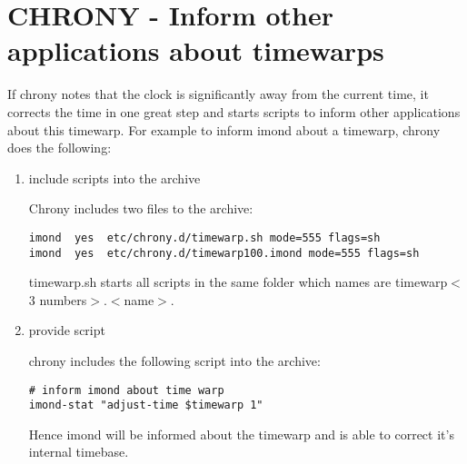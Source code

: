 
\section{CHRONY - Inform other applications about timewarps}

If chrony notes that the clock is significantly away from the current time, it
corrects the time in one great step and starts scripts to inform other applications
about this timewarp. For example to inform imond about a timewarp, chrony does the
following:

\begin{enumerate}
\item include scripts into the archive

Chrony includes two files to the archive:

\begin{verbatim}
imond  yes  etc/chrony.d/timewarp.sh mode=555 flags=sh
imond  yes  etc/chrony.d/timewarp100.imond mode=555 flags=sh
\end{verbatim}

timewarp.sh starts all scripts in the same folder which names are 
timewarp$<$3 numbers$>$.$<$name$>$.

\item provide script

chrony includes the following script into the archive:

\begin{verbatim}
# inform imond about time warp
imond-stat "adjust-time $timewarp 1"
\end{verbatim}

Hence imond will be informed about the timewarp and is able to correct it's 
internal timebase.
\end{enumerate}
